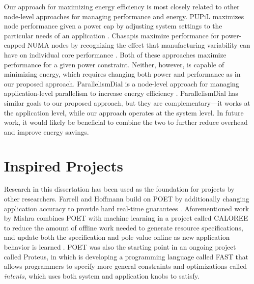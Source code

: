 Our approach for maximizing energy efficiency is most closely related to other node-level approaches for managing performance and energy.
PUPiL maximizes node performance given a power cap by adjusting system settings to the particular needs of an application \cite{pupil}.
Chasapis \etal maximize performance for power-capped NUMA nodes by recognizing the effect that manufacturing variability can have on individual core performance \cite{Chasapis2016}.
Both of these approaches maximize performance for a given power constraint.
Neither, however, is capable of minimizing energy, which requires changing both power and performance as in our proposed approach.
ParallelismDial is a node-level approach for managing application-level parallelism to increase energy efficiency \cite{Sridharan2013}.
ParallelismDial has similar goals to our proposed approach, but they are complementary---it works at the application level, while our approach operates at the system level.
In future work, it would likely be beneficial to combine the two to further reduce overhead and improve energy savings.


\section{Inspired Projects}

Research in this dissertation has been used as the foundation for projects by other researchers.
Farrell and Hoffmann build on POET by additionally changing application accuracy to provide hard real-time guarantees \cite{meantime}.
Aforementioned work by Mishra \etal combines POET with machine learning in a project called CALOREE to reduce the amount of offline work needed to generate resource specifications, and update both the specification and pole value online as new application behavior is learned \cite{CALOREE}.
POET was also the starting point in an ongoing project called Proteus, in which is developing a programming language called FAST that allows programmers to specify more general constraints and optimizations called \emph{intents}, which uses both system and application knobs to satisfy.
